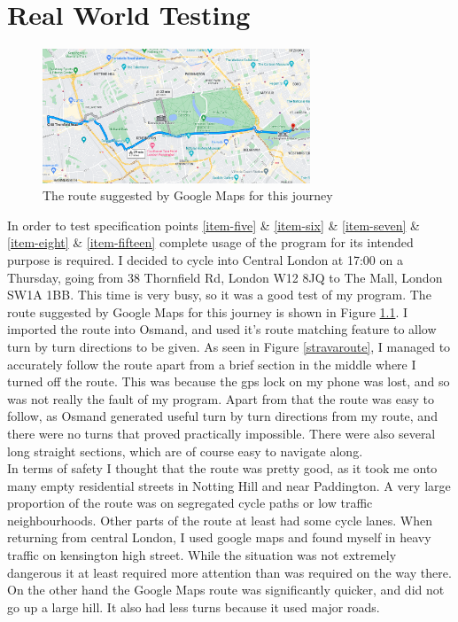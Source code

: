 \documentclass[11pt,twoside,a4paper]{report}
\begin{document}
\chapter{Real World Testing}
\label{Real World Testing}
\begin{figure}[h]
\begin{center}
    \includegraphics[width=8cm]{googlemapsroute.png}
\end{center}
\caption{The route suggested by Google Maps for this journey}
\label{googlemapsmall}
\end{figure}
In order to test specification points \ref{item-five} \& \ref{item-six} \& \ref{item-seven} \& \ref{item-eight} \& \ref{item-fifteen} complete usage of the program for its intended purpose is required.
I decided to cycle into Central London at 17:00 on a Thursday, going from 38 Thornfield Rd, London W12 8JQ to The Mall, London SW1A 1BB. This time is very busy, so it was a good test of my program.  The route suggested by Google Maps for this journey is shown in Figure \ref{googlemapsmall}.
I imported the route into Osmand, and used it's route matching feature to allow turn by turn directions to be given. As seen in Figure \ref{stravaroute}, I managed to accurately follow the route apart from a brief section in the middle where I turned off the route.
This was because the gps lock on my phone was lost, and so was not really the fault of my program. Apart from that the route was easy to follow, as Osmand generated useful turn by turn directions from my route, and there were no turns that proved practically impossible.
There were also several long straight sections, which are of course easy to navigate along. \\
In terms of safety I thought that the route was pretty good, as it took me onto many empty residential streets in Notting Hill and near Paddington. A very large proportion of the route was on segregated cycle paths or low traffic neighbourhoods. Other parts of the route at least had some cycle lanes. 
When returning from central London, I used google maps and found myself in heavy traffic on kensington high street. While the situation was not extremely dangerous it at least required more attention than was required on the way there. On the other hand the Google Maps route was significantly quicker, and did not go up a large hill. It also had less turns because it used major roads.   
\end{document}
